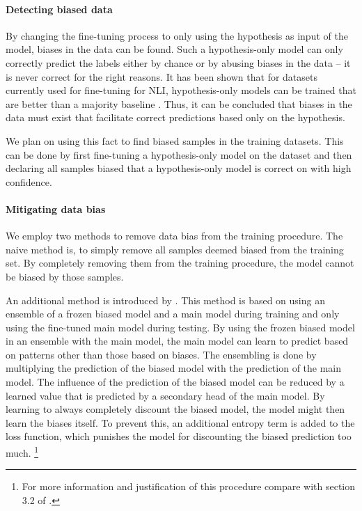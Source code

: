 \documentclass[12pt,a4paper]{article}
\begin{document}
\paragraph{Detecting biased data}

By changing the fine-tuning process to only using the hypothesis as input of the model, biases in the data can be found. Such a hypothesis-only model can only correctly predict the labels either by chance or by abusing biases in the data -- it is never correct for the right reasons. It has been shown that for datasets currently used for fine-tuning for \acs{NLI}, hypothesis-only models can be trained that are better than a majority baseline \parencite{hyponly}. Thus, it can be concluded that biases in the data must exist that facilitate correct predictions based only on the hypothesis.

We plan on using this fact to find biased samples in the training datasets. This can be done by first fine-tuning a hypothesis-only model on the dataset and then declaring all samples biased that a hypothesis-only model is correct on with high confidence.

\paragraph{Mitigating data bias}

We employ two methods to remove data bias from the training procedure. The naive method is, to simply remove all samples deemed biased from the training set. By completely removing them from the training procedure, the model cannot be biased by those samples.

An additional method is introduced by \cite{ensemble}. This method is based on using an ensemble of a frozen biased model and a main model during training and only using the fine-tuned main model during testing. By using the frozen biased model in an ensemble with the main model, the main model can learn to predict based on patterns other than those based on biases. The ensembling is done by multiplying the prediction of the biased model with the prediction of the main model. The influence of the prediction of the biased model can be reduced by a learned value that is predicted by a secondary head of the main model. By learning to always completely discount the biased model, the model might then learn the biases itself. To prevent this, an additional entropy term is added to the loss function, which punishes the model for discounting the biased prediction too much. \footnote{For more information and justification of this procedure compare with section 3.2 of \cite{ensemble}.}
\end{document}
